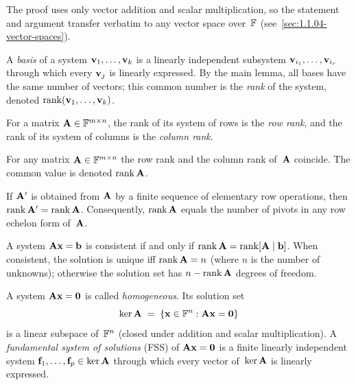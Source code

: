 \begin{remark}
\label{rem:main-lemma-abstract}
The proof uses only vector addition and scalar multiplication, so the
statement and argument transfer verbatim to any vector space over~$\mathbb{F}$
(see~\cref{sec:1.1.04-vector-spaces}).
\end{remark}

\begin{definition}
\label{def:basis-rank-system}
A \emph{basis} of a system $\mathbf{v}_1, \dots, \mathbf{v}_k$ is a
linearly independent subsystem $\mathbf{v}_{i_1}, \dots, \mathbf{v}_{i_r}$
through which every $\mathbf{v}_j$ is linearly expressed. By the main
lemma, all bases have the same number of vectors; this common number
is the \emph{rank} of the system, denoted
$\operatorname{rank}(\mathbf{v}_1, \dots, \mathbf{v}_k)$.
\end{definition}

For a matrix $\mathbf{A} \in \mathbb{F}^{m \times n}$, the rank of its system of
rows is the \emph{row rank}, and the rank of its system of columns is
the \emph{column rank}.

\begin{theorem}
\label{thm:rank-row-col}
For any matrix $\mathbf{A} \in \mathbb{F}^{m \times n}$ the row rank and the
column rank of~$\mathbf{A}$ coincide. The common value is denoted
$\operatorname{rank} \mathbf{A}$.
\end{theorem}

\begin{proposition}
\label{prop:rank-ero-invariance}
If $\mathbf{A}'$ is obtained from $\mathbf{A}$ by a finite sequence of
elementary row operations, then $\operatorname{rank} \mathbf{A}' = \operatorname{rank} \mathbf{A}$.
Consequently, $\operatorname{rank} \mathbf{A}$ equals the number of pivots in any row
echelon form of~$\mathbf{A}$.
\end{proposition}

\begin{theorem}
\label{thm:kronecker-capelli}
A system $\mathbf{A}\mathbf{x} = \mathbf{b}$ is consistent if and only if
$\operatorname{rank} \mathbf{A} = \operatorname{rank} [\mathbf{A} \mid \mathbf{b}]$. When consistent, the
solution is unique iff $\operatorname{rank} \mathbf{A} = n$ (where $n$ is the number of
unknowns); otherwise the solution set has $n - \operatorname{rank} \mathbf{A}$ degrees
of freedom.
\end{theorem}

\begin{definition}
\label{def:fsr}
A system $\mathbf{A}\mathbf{x} = \mathbf{0}$ is called \emph{homogeneous}.
Its solution set
\[
  \ker \mathbf{A} \;=\; \{\mathbf{x} \in \mathbb{F}^n : \mathbf{A}\mathbf{x} = \mathbf{0}\}
\]
is a linear subspace of~$\mathbb{F}^n$ (closed under addition and scalar
multiplication). A \emph{fundamental system of solutions} (FSS) of
$\mathbf{A}\mathbf{x} = \mathbf{0}$ is a finite linearly independent system
$\mathbf{f}_1, \dots, \mathbf{f}_p \in \ker \mathbf{A}$ through which every
vector of~$\ker \mathbf{A}$ is linearly expressed.
\end{definition}

